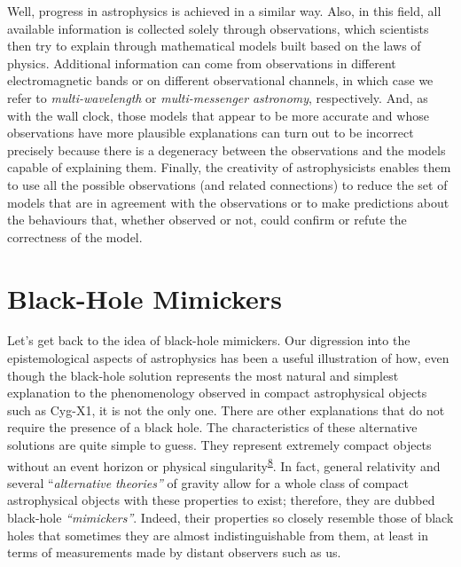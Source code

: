 Well, progress in astrophysics is achieved in a similar way. Also, in this field, all
available information is collected solely through observations, which scientists then
try to explain through mathematical models built based on the laws of physics.
Additional information can come from observations in different electromagnetic bands or
on different observational channels, in which case we refer to
\emph{multi-wavelength} or
\emph{multi-messenger}
\emph{astronomy}, respectively. And, as with the wall clock, those models that appear to
be more accurate and whose observations have more plausible explanations can turn out to
be incorrect precisely because there is a degeneracy between the
observations and the models capable of explaining them. Finally, the creativity of
astrophysicists enables them to use all the possible observations (and related
connections) to reduce the set of models that are in agreement with the observations or
to make predictions about the behaviours that, whether observed or not, could confirm or
refute the correctness of the model.

\section{Black-Hole Mimickers}\label{sec:06-mimickers}

Let's get back to the idea of black-hole mimickers. Our digression into the
epistemological aspects of astrophysics has been a useful illustration of how, even
though the black-hole solution represents the most natural and simplest explanation to
the phenomenology observed in compact astrophysical objects such as Cyg-X1, it is not
the only one. There are other explanations that do not require the presence of a black
hole. The characteristics of these alternative solutions are quite simple to guess. They
represent extremely compact objects without an event horizon or physical
singularity\textsuperscript{\hyperlink{note:06-08}{8}}. In fact, general
relativity and several ``\emph{alternative}
\emph{theories''} of gravity allow for a whole class of compact astrophysical objects
with these properties to exist; therefore, they are dubbed black-hole
\emph{``mimickers}\emph{''}. Indeed, their properties so closely
resemble those of black holes that sometimes they are almost indistinguishable from
them, at least in terms of measurements made by distant observers such as us.

